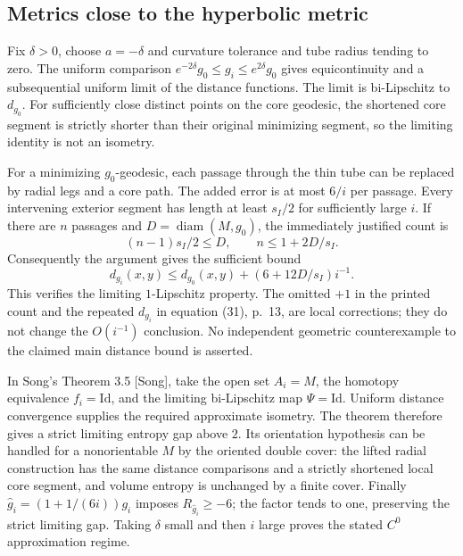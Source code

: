 \documentclass[10pt]{article}
\begin{document}
\subsection*{Metrics close to the hyperbolic metric}
Fix \(\delta>0\), choose \(a=-\delta\) and curvature tolerance and tube radius tending to zero. The uniform comparison \(e^{-2\delta}g_0\leq g_i\leq e^{2\delta}g_0\) gives equicontinuity and a subsequential uniform limit of the distance functions. The limit is bi-Lipschitz to \(d_{g_0}\). For sufficiently close distinct points on the core geodesic, the shortened core segment is strictly shorter than their original minimizing segment, so the limiting identity is not an isometry.\par
For a minimizing \(g_0\)-geodesic, each passage through the thin tube can be replaced by radial legs and a core path. The added error is at most \(6/i\) per passage. Every intervening exterior segment has length at least \(s_I/2\) for sufficiently large \(i\). If there are \(n\) passages and \(D=\operatorname{diam}(M,g_0)\), the immediately justified count is \[(n-1)s_I/2\leq D,\qquad n\leq1+2D/s_I.\] Consequently the argument gives the sufficient bound \[d_{g_i}(x,y)\leq d_{g_0}(x,y)
             +(6+12D/s_I)i^{-1}.\] This verifies the limiting \(1\)-Lipschitz property. The omitted \(+1\) in the printed count and the repeated \(d_{g_i}\) in equation (31), p. 13, are local corrections; they do not change the \(O(i^{-1})\) conclusion. No independent geometric counterexample to the claimed main distance bound is asserted.\par
In Song’s Theorem 3.5 [Song], take the open set \(A_i=M\), the homotopy equivalence \(f_i=\mathrm{Id}\), and the limiting bi-Lipschitz map \(\Psi=\mathrm{Id}\). Uniform distance convergence supplies the required approximate isometry. The theorem therefore gives a strict limiting entropy gap above \(2\). Its orientation hypothesis can be handled for a nonorientable \(M\) by the oriented double cover: the lifted radial construction has the same distance comparisons and a strictly shortened local core segment, and volume entropy is unchanged by a finite cover. Finally \(\widehat g_i=(1+1/(6i))g_i\) imposes \(R_{\widehat g_i}\geq-6\); the factor tends to one, preserving the strict limiting gap. Taking \(\delta\) small and then \(i\) large proves the stated \(C^0\) approximation regime.\par
\end{document}
